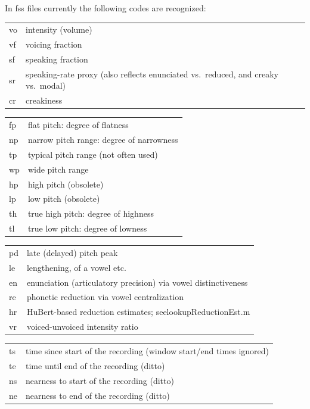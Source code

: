 \documentclass[11pt]{article}
\begin{document}
In fss files currently the following codes are recognized:


\begin{tabular}{ll}
  vo  & intensity (volume) \\
  vf  & voicing fraction \\
  sf  & speaking fraction \\
  sr  & speaking-rate proxy (also reflects enunciated vs.~reduced, and creaky vs.~modal) \\
  cr  & creakiness \\
\end{tabular}

\begin{tabular}{ll}
  fp  & flat pitch: degree of flatness \\
  np  & narrow pitch range: degree of narrowness \\
  tp  & typical pitch range (not often used)\\
  wp  & wide pitch range  \\
  hp  & high pitch (obsolete) \\ 
  lp  & low pitch (obsolete) \\
  th  & true high pitch: degree of highness  \\ 
  tl  & true low pitch: degree of lowness \\
\end{tabular}

\begin{tabular}{ll}
  pd  & late (delayed) pitch peak \\
  le  & lengthening, of a vowel etc. \\
  en  & enunciation (articulatory precision) via vowel distinctiveness \\
  re  & phonetic reduction via vowel centralization \\
  hr  & HuBert-based reduction estimates; seelookupReductionEst.m \\
  vr & voiced-unvoiced intensity ratio \\
\end{tabular}

\begin{tabular}{ll}
  ts  & time since start of the recording (window start/end times ignored) \\
  te  & time until end of the recording (ditto) \\
  ns  & nearness to start of the recording (ditto) \\
  ne  & nearness to end of the recording (ditto) \\
\end{tabular}
\end{document}
